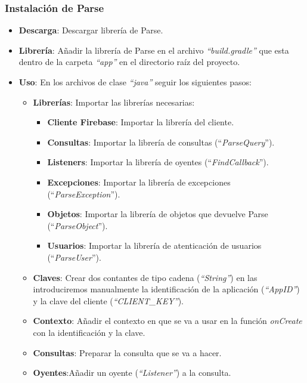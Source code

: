 	\subsubsection{Instalación de Parse}
		\begin{itemize}
			\item {\bf Descarga}: Descargar librería de Parse.
				
			
			\item {\bf Librería}: Añadir la librería de Parse en el archivo {\it ``build.gradle''} que esta dentro de la carpeta {\it ``app''} en el directorio raíz del proyecto.
			\item {\bf Uso}: En los archivos de clase {\it ``java''}\cite{14:java:online} seguir los siguientes pasos:
				\begin{itemize}
					\item {\bf Librerías}: Importar las librerías necesarias:
						\begin{itemize}
							\item {\bf Cliente Firebase}: Importar la librería del cliente.
							\item {\bf Consultas}: Importar la librería de consultas (``{\em ParseQuery}'').
							\item {\bf Listeners}: Importar la librería de oyentes (``{\em FindCallback}'').
							\item {\bf Excepciones}: Importar la librería de excepciones (``{\em ParseException}'').
							\item {\bf Objetos}: Importar la librería de objetos que devuelve Parse (``{\em ParseObject}'').
							\item {\bf Usuarios}: Importar la librería de atenticación de usuarios (``{\em ParseUser}'').
						\end{itemize}
					\item {\bf Claves}: Crear dos contantes de tipo cadena ({\em ``String''}) en las introduciremos manualmente la identificación de la aplicación ({\em ``AppID''}) y la clave del cliente ({\em ``CLIENT\_KEY''}).
					\item {\bf Contexto}: Añadir el contexto en que se va a usar en la función {\it onCreate} con la identificación y la clave.
					\item {\bf Consultas}: Preparar la consulta que se va a hacer.
					\item {\bf Oyentes}:Añadir un oyente ({\it ``Listener''}) a la consulta.
				\end{itemize}
				\noindent
				
		\end{itemize}
		
